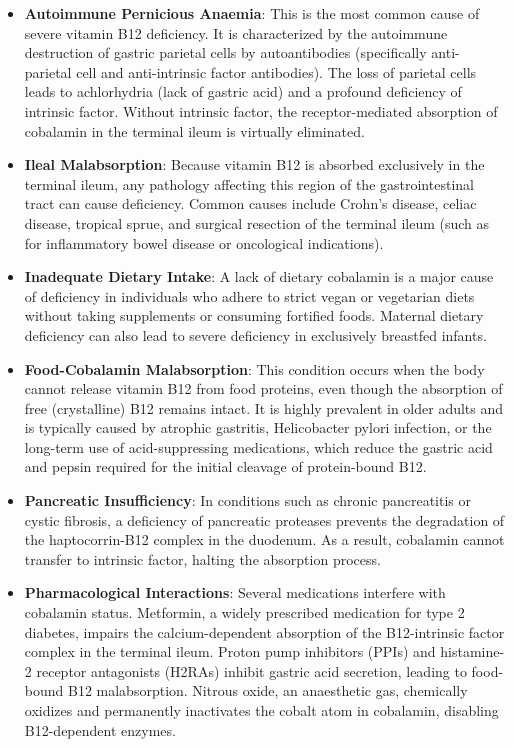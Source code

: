 \begin{itemize}
    \item \textbf{Autoimmune Pernicious Anaemia}: This is the most common cause of severe vitamin B12 deficiency. It is characterized by the autoimmune destruction of gastric parietal cells by autoantibodies (specifically anti-parietal cell and anti-intrinsic factor antibodies). The loss of parietal cells leads to achlorhydria (lack of gastric acid) and a profound deficiency of intrinsic factor. Without intrinsic factor, the receptor-mediated absorption of cobalamin in the terminal ileum is virtually eliminated.
    \item \textbf{Ileal Malabsorption}: Because vitamin B12 is absorbed exclusively in the terminal ileum, any pathology affecting this region of the gastrointestinal tract can cause deficiency. Common causes include Crohn's disease, celiac disease, tropical sprue, and surgical resection of the terminal ileum (such as for inflammatory bowel disease or oncological indications).
    \item \textbf{Inadequate Dietary Intake}: A lack of dietary cobalamin is a major cause of deficiency in individuals who adhere to strict vegan or vegetarian diets without taking supplements or consuming fortified foods. Maternal dietary deficiency can also lead to severe deficiency in exclusively breastfed infants.
    \item \textbf{Food-Cobalamin Malabsorption}: This condition occurs when the body cannot release vitamin B12 from food proteins, even though the absorption of free (crystalline) B12 remains intact. It is highly prevalent in older adults and is typically caused by atrophic gastritis, Helicobacter pylori infection, or the long-term use of acid-suppressing medications, which reduce the gastric acid and pepsin required for the initial cleavage of protein-bound B12.
    \item \textbf{Pancreatic Insufficiency}: In conditions such as chronic pancreatitis or cystic fibrosis, a deficiency of pancreatic proteases prevents the degradation of the haptocorrin-B12 complex in the duodenum. As a result, cobalamin cannot transfer to intrinsic factor, halting the absorption process.
    \item \textbf{Pharmacological Interactions}: Several medications interfere with cobalamin status. Metformin, a widely prescribed medication for type 2 diabetes, impairs the calcium-dependent absorption of the B12-intrinsic factor complex in the terminal ileum. Proton pump inhibitors (PPIs) and histamine-2 receptor antagonists (H2RAs) inhibit gastric acid secretion, leading to food-bound B12 malabsorption. Nitrous oxide, an anaesthetic gas, chemically oxidizes and permanently inactivates the cobalt atom in cobalamin, disabling B12-dependent enzymes.

\end{itemize}
